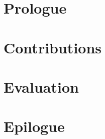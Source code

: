 \documentclass[format=a4-sdq]{sdqdiss}
\begin{document}
\maketitle
\frontmatter



\tableofcontents
\listoffigures
\listoftables

\mainmatter

\part{Prologue}



\part{Contributions}





\part{Evaluation}


\part{Epilogue}




\printbibliography[heading=bibintoc]
\end{document}
